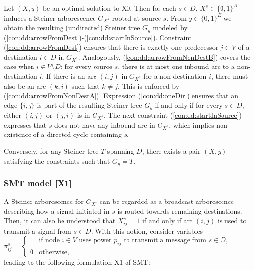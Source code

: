 Let $(X,y)$ be an optimal solution to X0.
Then for each $s\in D$, $X^s\in \{0,1\}^{A}$ induces a Steiner arborescence $G_{X^s}$ rooted at source $s$.
From $y\in \{0,1\}^E$ we obtain the resulting (undirected) Steiner tree $G_{y}$ modeled by (\ref{con:dd:arrowFromDest})-(\ref{con:dd:startInSource}).
Constraint (\ref{con:dd:arrowFromDest}) ensures that there is exactly one predecessor $j\in V$ of a destination $i\in D$ in $G_{X^s}$.
Analogously, (\ref{con:dd:arrowFromNonDestB}) covers the case when $i \in V\setminus D$: for every source $s$, there is at most one inbound arc to a non-destination $i$.
If there is an arc $(i,j)$ in $G_{X^s}$ for a non-destination $i$, there must also be an arc $(k,i)$ such that $k\neq j$.
This is enforced by (\ref{con:dd:arrowFromNonDestA}).
Expression (\ref{con:dd:oneDir}) ensures that an edge $\{i,j\}$ is part of the resulting Steiner tree $G_{y}$ if and only if for every $s\in D$, either $(i,j)$ or $(j,i)$ is in $G_{X^s}$.
The next constraint (\ref{con:dd:startInSource}) expresses that $s$ does not have any inbound arc in $G_{X^s}$, which implies non-existence of a directed cycle containing $s$.

Conversely, for any Steiner tree $T$ spanning $D$, there exists a pair $(X,y)$ satisfying the constraints such that $G_y=T$. 

\subsubsection{SMT model [X1]}

A Steiner arborescence for $G_{X^s}$ can be regarded as a broadcast arborescence describing how a signal initiated in $s$ is routed towards remaining destinations. 
Then, it can also be understood that $X_{ij}^s=1$ if and only if arc $(i,j)$ is used to transmit a signal from $s\in D$.
With this notion, consider variables
\newline\newline
$\pi^s_{ij}=
\begin{cases}
    1 & \text{if node $i \in V$ uses power $p_{ij}$ to transmit a message from $s\in D$},\\
    0 & \text{otherwise},
  \end{cases}$
\newline\newline
leading to the following formulation X1 of SMT:

